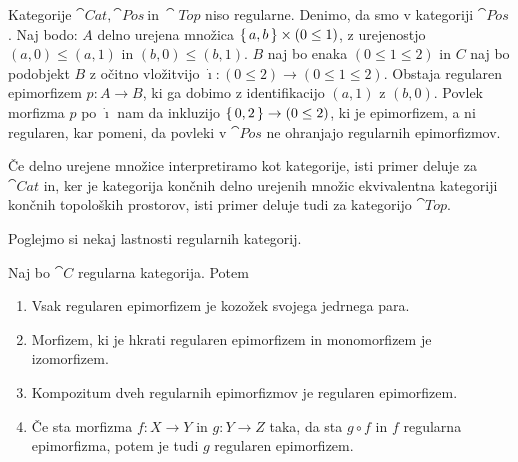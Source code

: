 \documentclass[../kategoricna_logika.tex]{subfiles}
\begin{document}
\begin{primer}
  Kategorije $\cat{Cat}, \cat{Pos}\ \text{in}\ \cat{Top}$ niso
  regularne. Denimo, da smo v kategoriji $\cat{Pos}$.
  Naj bodo: $A$ delno urejena množica $\lbrace\,a, b\,\rbrace \times (0 \leq 1)$,
  z urejenostjo $(a,0) \leq (a,1)$ in $(b,0) \leq (b,1)$.
  $B$ naj bo enaka $(0 \leq 1 \leq 2)$ in $C$ naj bo podobjekt $B$
  z očitno vložitvijo ${\dot{\imath}} : (0 \leq 2) \to (0 \leq 1 \leq 2)$.
  Obstaja regularen epimorfizem ${p : A \to B}$, ki ga
  dobimo z identifikacijo $(a,1)$ z $(b, 0)$. Povlek morfizma $p$ po
  $\dot{\imath}$ nam da inkluzijo $\lbrace\,0, 2\,\rbrace \to (0 \leq 2)$, ki je
  epimorfizem, a ni regularen, kar pomeni, da povleki v $\cat{Pos}$ ne
  ohranjajo regularnih epimorfizmov.

  Če delno urejene množice interpretiramo kot kategorije, isti primer
  deluje za $\cat{Cat}$ in, ker je kategorija končnih delno urejenih
  množic ekvivalentna kategoriji končnih topoloških prostorov, isti
  primer deluje tudi za kategorijo $\cat{Top}$.
\end{primer}
Poglejmo si nekaj lastnosti regularnih kategorij.
\begin{lema}\label{lema:lastnosti-regularnih-epimorfizmov}
  Naj bo $\cat{C}$ regularna kategorija. Potem
  \begin{enumerate}[label=(\roman*), nosep]
  \item Vsak regularen epimorfizem je kozožek svojega jedrnega para.
  \item Morfizem, ki je hkrati regularen epimorfizem in monomorfizem
    je izo\-morfizem.
  \item Kompozitum dveh regularnih epimorfizmov je regularen
    epimorfizem.
  \item Če sta morfizma $f : X \to Y$ in $g : Y \to Z$ taka, da sta
    $g \circ f$ in $f$ regularna epimorfizma, potem je tudi $g$
    regularen epimorfizem.
  \end{enumerate}
\end{lema}
\end{document}
